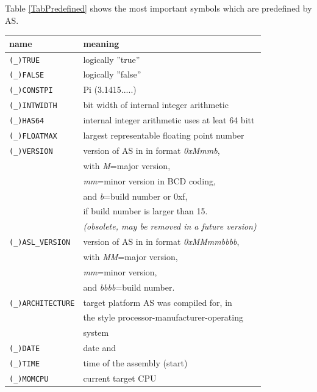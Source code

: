 \documentclass[12pt,twoside]{report}
\newcommand{\asname}{{AS}}
\newcommand{\predefsym}[1]{{\tt (\_)#1}}
\begin{document}
Table \ref{TabPredefined} shows the most important symbols which are
predefined by \asname{}.
\begin{table}[htb]
\begin{center}\begin{tabular}{|l|l|}
\hline
name          & meaning \\
\hline
\hline
\predefsym{TRUE}         & logically ''true'' \\
\predefsym{FALSE}        & logically ''false'' \\
\predefsym{CONSTPI}      & Pi (3.1415.....) \\
\predefsym{INTWIDTH}     & bit width of internal integer arithmetic \\
\predefsym{HAS64}        & internal integer arithmetic uses at leat 64 bitt \\
\predefsym{FLOATMAX}     & largest representable floating point number \\
\predefsym{VERSION}      & version of \asname{} in in format {\em 0xMmmb}, \\
                         & with {\em M}=major version, \\
                         & {\em mm}=minor version in BCD coding, \\
                         & and {\em b}=build number or 0xf, \\
                         & if build number is larger than 15. \\
                         & {\em (obsolete, may be removed in a future version) } \\
\predefsym{ASL\_VERSION} & version of \asname{} in in format {\em 0xMMmmbbbb}, \\
                         & with {\em MM}=major version, \\
                         & {\em mm}=minor version, \\
                         & and {\em bbbb}=build number. \\
\predefsym{ARCHITECTURE} & target platform \asname{} was compiled for, in \\
                         & the style processor-manufacturer-operating \\
                         & system \\
\predefsym{DATE}         & date and \\
\predefsym{TIME}         & time of the assembly (start) \\
\predefsym{MOMCPU}       & current target CPU \\

\end{tabular}
\end{center}
\end{table}
\end{document}
